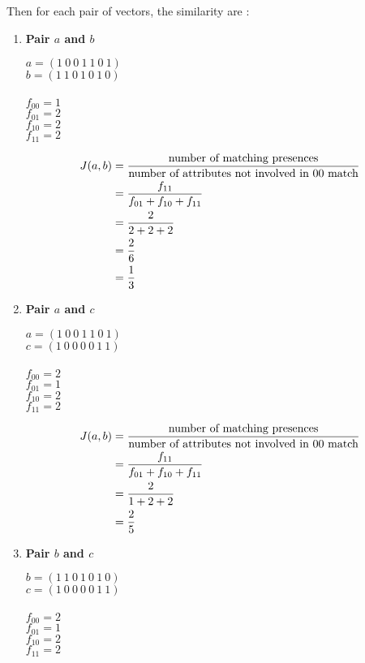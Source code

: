 \documentclass[12pt]{article}%
\begin{document}
\begin{enumerate}
\begin{enumerate}
		\par Then for each pair of vectors, the similarity are :
		\begin{enumerate}
			\item \textbf{Pair $a$ and $b$}
			\par $a = (1 \ 0 \ 0 \ 1 \ 1 \ 0 \ 1)$ \\ $b = (1 \ 1 \ 0 \ 1 \ 0 \ 1 \ 0)$ \\
			\\ $f_{00} = 1$
			\\ $f_{01} = 2$
			\\ $f_{10} = 2$
			\\ $f_{11} = 2$

			\begin{align*}
				J(a,b) & = \frac{\textup{number of matching presences}}{\textup{number of attributes not involved in 00 match}} \\
				& = \frac{f_{11}}{f_{01}+f_{10}+f_{11}} \\
				& = \frac{2}{2+2+2} \\
				& = \frac{2}{6} \\
				& = \frac{1}{3}
			\end{align*}
			
			\item \textbf{Pair $a$ and $c$}
			\par $a = (1 \ 0 \ 0 \ 1 \ 1 \ 0 \ 1)$ \\ $c = (1 \ 0 \ 0 \ 0 \ 0 \ 1 \ 1)$ \\
			\\ $f_{00} = 2$
			\\ $f_{01} = 1$
			\\ $f_{10} = 2$
			\\ $f_{11} = 2$


			\begin{align*}
				J(a,b) & = \frac{\textup{number of matching presences}}{\textup{number of attributes not involved in 00 match}} \\
				& = \frac{f_{11}}{f_{01}+f_{10}+f_{11}} \\
				& = \frac{2}{1+2+2} \\
				& = \frac{2}{5} \\
			\end{align*}

			\item \textbf{Pair $b$ and $c$}
			\par $b = (1 \ 1 \ 0 \ 1 \ 0 \ 1 \ 0)$ \\ $c = (1 \ 0 \ 0 \ 0 \ 0 \ 1 \ 1)$ \\
			\\ $f_{00} = 2$
			\\ $f_{01} = 1$
			\\ $f_{10} = 2$
			\\ $f_{11} = 2$



\end{enumerate}
\end{enumerate}
\end{enumerate}
\end{document}
